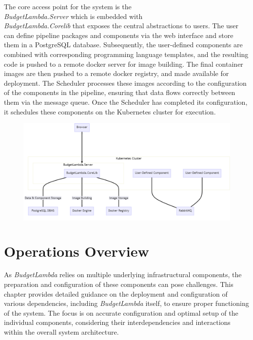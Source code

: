 \documentclass[fleqn,10pt]{SelfArx} %
\begin{document}
The core access point for the system is the \\ \emph{BudgetLambda.Server} which is embedded with \\ \emph{BudgetLambda.Corelib} that exposes the central abstractions to users. The user can define pipeline packages and components via the web interface and store them in a PostgreSQL database. Subsequently, the user-defined components are combined with corresponding programming language templates, and the resulting code is pushed to a remote docker server for image building. The final container images are then pushed to a remote docker registry, and made available for deployment. The Scheduler processes these images according to the configuration of the components in the pipeline, ensuring that data flows correctly between them via the message queue. Once the Scheduler has completed its configuration, it schedules these components on the Kubernetes cluster for execution.

\begin{figure}
	\includegraphics[width=\columnwidth]{fig1}
\end{figure}



\section{Operations Overview}

As \emph{BudgetLambda} relies on multiple underlying infrastructural components, the preparation and configuration of these components can pose challenges. This chapter provides detailed guidance on the deployment and configuration of various dependencies, including \emph{BudgetLambda} itself, to ensure proper functioning of the system. The focus is on accurate configuration and optimal setup of the individual components, considering their interdependencies and interactions within the overall system architecture.
\end{document}
